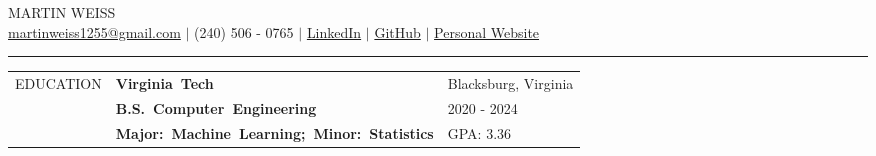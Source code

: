 \documentclass[12pt, letter]{book}
\begin{document}
\begin{center}
    {\Huge MARTIN WEISS} \\
    \href{mailto:martinweiss1255@gmail.com}{{martinweiss1255@gmail.com}} $|$ 
    (240) 506 - 0765 $|$ 
    \href{https://www.linkedin.com/in/martinweiss12}{LinkedIn} $|$
    \href{https://github.com/MartinWeiss12}{GitHub} $|$
    \href{https://martiniweiss.com}{Personal Website}\\[-2mm]
    \rule{\textwidth}{0.4pt}
    
\end{center}


\noindent
\begin{tabular}{@{}>{\raggedright\arraybackslash}p{3.5cm}@{}p{5cm}@{}>{\raggedleft\arraybackslash}p{10.5cm}@{}}
    \footnotesize {EDUCATION} & \textbf{\footnotesize\mbox{Virginia Tech}} & {\footnotesize {Blacksburg, Virginia}} \\
    & \textbf{\footnotesize\mbox{B.S. Computer Engineering}} & {\footnotesize {2020 - 2024}} \\
    & \textbf{\footnotesize\mbox{Major: Machine Learning; Minor: Statistics}} & {\footnotesize {GPA: 3.36}} \\
\end{tabular}

\vspace{4mm}

\end{document}
